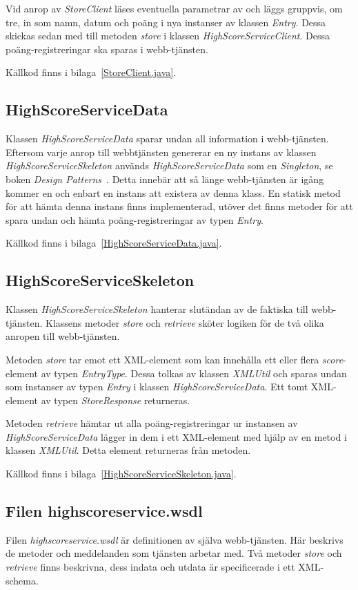 \documentclass[a4paper, 12pt]{article}
\begin{document}
Vid anrop av \textit{StoreClient} läses eventuella parametrar av och
läggs gruppvis, om tre, in som namn, datum och poäng i nya instanser av
klassen \textit{Entry}. Dessa skickas sedan med till metoden
\textit{store} i klassen \textit{HighScoreServiceClient}. Dessa
poäng-registreringar ska sparas i webb-tjänsten.

Källkod finns i bilaga~\ref{StoreClient.java}.

\subsection{HighScoreServiceData}
Klassen \textit{HighScoreServiceData} sparar undan all information i
webb-tjänsten. Eftersom varje anrop till webbtjänsten genererar en ny
instans av klassen \textit{HighScoreServiceSkeleton} används
\textit{HighScoreServiceData} som en \textit{Singleton}, se boken
\textit{Design Patterns}~\cite{gamma}. Detta innebär att så länge
webb-tjänsten är igång kommer en och enbart en instans att existera av
denna klass. En statisk metod för att hämta denna instans finns
implementerad, utöver det finns metoder för att spara undan och hämta
poäng-registreringar av typen \textit{Entry}.

Källkod finns i bilaga~\ref{HighScoreServiceData.java}.

\subsection{HighScoreServiceSkeleton}
Klassen \textit{HighScoreServiceSkeleton} hanterar slutändan av de
faktiska till webb-tjänsten. Klassens metoder \textit{store} och
\textit{retrieve} sköter logiken för de två olika anropen till
webb-tjänsten.

Metoden \textit{store} tar emot ett XML-element som kan innehålla ett
eller flera \textit{score}-element av typen \textit{EntryType}. Dessa
tolkas av klassen \textit{XMLUtil} och sparas undan som instanser av
typen \textit{Entry} i klassen \textit{HighScoreServiceData}. Ett tomt
XML-element av typen \textit{StoreResponse} returneras.

Metoden \textit{retrieve} hämtar ut alla poäng-registreringar ur
instansen av \textit{HighScoreServiceData} lägger in dem i ett
XML-element med hjälp av en metod i klassen \textit{XMLUtil}. Detta
element returneras från metoden.

Källkod finns i bilaga~\ref{HighScoreServiceSkeleton.java}.

\subsection{Filen highscoreservice.wsdl}\label{sec:highscoreservice.wsdl}
Filen \textit{highscoreservice.wsdl} är definitionen av själva
webb-tjänsten. Här beskrivs de metoder och meddelanden som tjänsten
arbetar med. Två metoder \textit{store} och \textit{retrieve} finns
beskrivna, dess indata och utdata är specificerade i ett
XML-schema.
\end{document}
